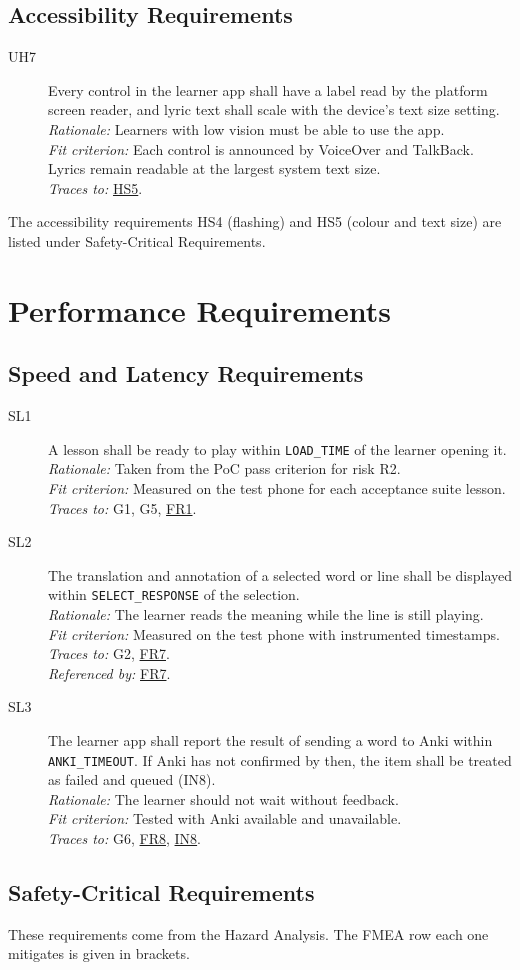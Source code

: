 \documentclass[12pt]{article}
\newcommand{\cn}[1]{\texttt{#1}}
\newcommand{\rat}[1]{\\\textit{Rationale:} #1}
\newcommand{\fit}[1]{\\\textit{Fit criterion:} #1}
\newcommand{\trace}[1]{\\\textit{Traces to:} #1}
\newcommand{\usedby}[1]{\\\textit{Referenced by:} #1}
\newcommand{\reqdef}[1]{\hypertarget{req:#1}{#1}}
\newcommand{\req}[1]{\hyperlink{req:#1}{#1}}
\begin{document}
\subsection{Accessibility Requirements}
\begin{description}
\item[\reqdef{UH7}] Every control in the learner app shall have a label read by the
platform screen reader, and lyric text shall scale with the device's text size
setting.
\rat{Learners with low vision must be able to use the app.}
\fit{Each control is announced by VoiceOver and TalkBack. Lyrics remain
readable at the largest system text size.}
\trace{\req{HS5}.}
\end{description}

The accessibility requirements HS4 (flashing) and HS5 (colour and text size)
are listed under Safety-Critical Requirements.

\section{Performance Requirements}
\subsection{Speed and Latency Requirements}
\begin{description}
\item[\reqdef{SL1}] A lesson shall be ready to play within \cn{LOAD\_TIME} of the
learner opening it.
\rat{Taken from the PoC pass criterion for risk R2.}
\fit{Measured on the test phone for each acceptance suite lesson.}
\trace{G1, G5, \req{FR1}.}

\item[\reqdef{SL2}] The translation and annotation of a selected word or line shall be
displayed within \cn{SELECT\_RESPONSE} of the selection.
\rat{The learner reads the meaning while the line is still playing.}
\fit{Measured on the test phone with instrumented timestamps.}
\trace{G2, \req{FR7}.}
\usedby{\req{FR7}.}

\item[\reqdef{SL3}] The learner app shall report the result of sending a word to Anki
within \cn{ANKI\_TIMEOUT}. If Anki has not confirmed by then, the item shall
be treated as failed and queued (IN8).
\rat{The learner should not wait without feedback.}
\fit{Tested with Anki available and unavailable.}
\trace{G6, \req{FR8}, \req{IN8}.}
\end{description}

\subsection{Safety-Critical Requirements}
These requirements come from the Hazard Analysis. The FMEA row each one
mitigates is given in brackets.
\end{document}
